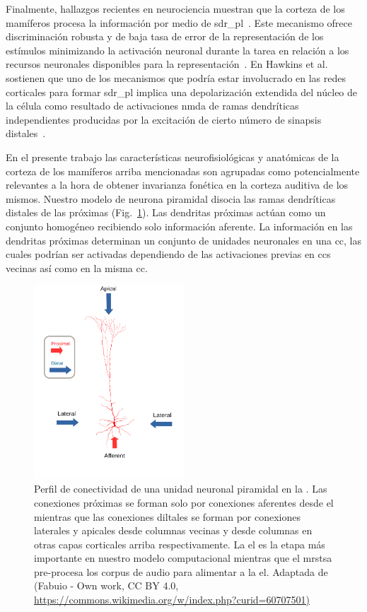 {Finalmente, hallazgos recientes en neurociencia muestran que la corteza de los mamíferos procesa la información por medio de \gls{sdr_pl}~\cite{barth_2012}. Este mecanismo ofrece discriminación robusta y de baja tasa de error de la representación de los estímulos minimizando la activación neuronal durante la tarea en relación a los recursos neuronales disponibles para la representación~\cite{ahmad_2016}. En Hawkins et al. \cite{hawkins_2016} sostienen que uno de los mecanismos que podría estar involucrado en las redes corticales para formar \gls{sdr_pl} implica una depolarización extendida del núcleo de la célula como resultado de activaciones \gls{nmda} de ramas dendríticas independientes producidas por la excitación de cierto número de sinapsis distales~\cite{antic_2010, major_2013}.

En el presente trabajo las características neurofisiológicas y anatómicas de la corteza de los mamíferos arriba mencionadas son agrupadas como potencialmente relevantes a la hora de obtener invarianza fonética en la corteza auditiva de los mismos. Nuestro modelo de neurona piramidal disocia las ramas dendríticas distales de las próximas (Fig.~\ref{fig:PyramidalCell}). Las dendritas próximas actúan como un conjunto homogéneo recibiendo solo información aferente. La información en las dendritas próximas determinan un conjunto de unidades neuronales en una \gls{cc}, las cuales podrían ser activadas dependiendo de las activaciones previas en \glspl{cc} vecinas así como en la misma \gls{cc}.

\begin{figure}[h!]
    \centering
    \includegraphics[width=0.5\textwidth]{PyramidalCell.png}
    \caption{Perfil de conectividad de una unidad neuronal piramidal en la .
	    Las conexiones próximas se forman solo por conexiones aferentes desde el 
	    mientras que las conexiones diltales se forman por conexiones laterales y apicales desde columnas vecinas y
	    desde columnas en otras capas corticales arriba respectivamente.
	    La \gls{el} es la etapa más importante en nuestro modelo computacional mientras que el \gls{mrstsa} pre-procesa los corpus de audio para alimentar a la \gls{el}.
	    Adaptada de (Fabuio - Own work, CC BY 4.0, \url{https://commons.wikimedia.org/w/index.php?curid=60707501)}}
    \label{fig:PyramidalCell}
\end{figure}

}
